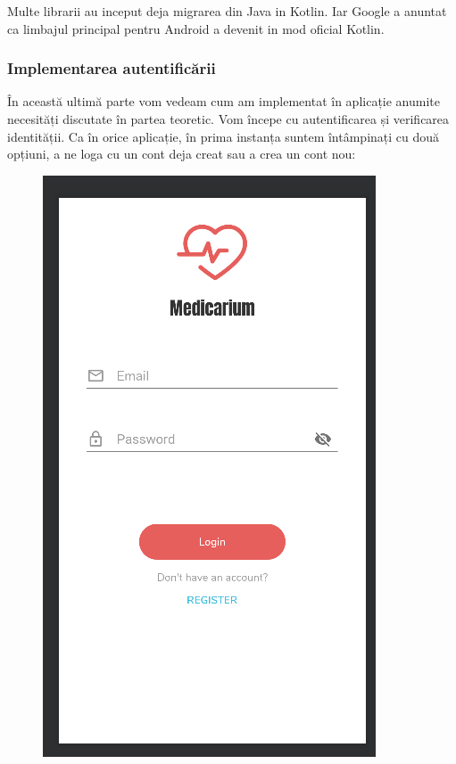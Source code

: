 \documentclass[12pt]{article}
\begin{document}
Multe librarii au inceput deja migrarea din Java in Kotlin. Iar Google a anuntat ca limbajul principal
pentru Android a devenit in mod oficial Kotlin.

\newpage
\subsubsection{Implementarea autentificării}
În această ultimă parte vom vedeam cum am implementat în aplicație anumite necesități
discutate în partea teoretic.
Vom începe cu autentificarea și verificarea identității. Ca în orice aplicație, în prima instanța suntem întâmpinați cu două opțiuni, a ne loga cu un cont deja creat sau a
crea un cont nou:

\begin{figure}[H]
    \centering
    \begin{minipage}[b]{0.4\textwidth}
      \includegraphics[width=\textwidth]{login.png}

\end{minipage}
\end{figure}
\end{document}
